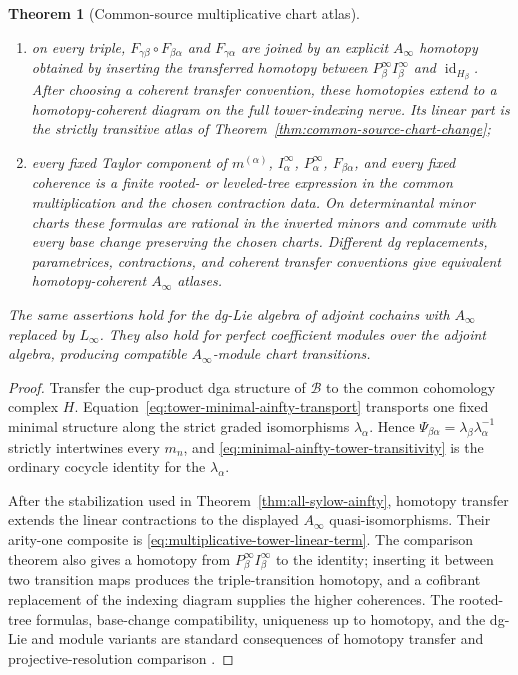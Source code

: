 \documentclass[11pt]{article}
\newtheorem{theorem}{Theorem}[section]
\theoremstyle{definition}
\begin{document}
\begin{theorem}[Common-source multiplicative chart atlas]
\begin{enumerate}[label=\textnormal{(\roman*)}]
\begin{equation}
 =i_\beta\Psi_{\beta\alpha}p_\alpha
 =\Theta_{\beta\alpha};
\end{equation}
\item on every triple, $F_{\gamma\beta}\circ F_{\beta\alpha}$ and $F_{\gamma\alpha}$ are joined by an explicit $A_\infty$ homotopy obtained by inserting the transferred homotopy between
$P_\beta^\infty I_\beta^\infty$ and $\operatorname{id}_{H_\beta}$.  After choosing a coherent transfer convention, these homotopies extend to a homotopy-coherent diagram on the full tower-indexing nerve.  Its linear part is the strictly transitive atlas of Theorem~\ref{thm:common-source-chart-change};
\item every fixed Taylor component of $m^{(\alpha)}$, $I_\alpha^\infty$, $P_\alpha^\infty$, $F_{\beta\alpha}$, and every fixed coherence is a finite rooted- or leveled-tree expression in the common multiplication and the chosen contraction data.  On determinantal minor charts these formulas are rational in the inverted minors and commute with every base change preserving the chosen charts.  Different dg replacements, parametrices, contractions, and coherent transfer conventions give equivalent homotopy-coherent $A_\infty$ atlases.
\end{enumerate}
The same assertions hold for the dg-Lie algebra of adjoint cochains with $A_\infty$ replaced by $L_\infty$.  They also hold for perfect coefficient modules over the adjoint algebra, producing compatible $A_\infty$-module chart transitions.
\end{theorem}

\begin{proof}
Transfer the cup-product dga structure of $\mathcal B$ to the common cohomology complex $H$.  Equation~\eqref{eq:tower-minimal-ainfty-transport} transports one fixed minimal structure along the strict graded isomorphisms $\lambda_\alpha$.  Hence $\Psi_{\beta\alpha}=\lambda_\beta\lambda_\alpha^{-1}$ strictly intertwines every $m_n$, and \eqref{eq:minimal-ainfty-tower-transitivity} is the ordinary cocycle identity for the $\lambda_\alpha$.

After the stabilization used in Theorem~\ref{thm:all-sylow-ainfty}, homotopy transfer extends the linear contractions to the displayed $A_\infty$ quasi-isomorphisms.  Their arity-one composite is \eqref{eq:multiplicative-tower-linear-term}.  The comparison theorem also gives a homotopy from $P_\beta^\infty I_\beta^\infty$ to the identity; inserting it between two transition maps produces the triple-transition homotopy, and a cofibrant replacement of the indexing diagram supplies the higher coherences.  The rooted-tree formulas, base-change compatibility, uniqueness up to homotopy, and the dg-Lie and module variants are standard consequences of homotopy transfer and projective-resolution comparison \cite{BurkeTransfer,ManettiPerturbation,VokrinekHPT}.
\end{proof}
\end{document}
